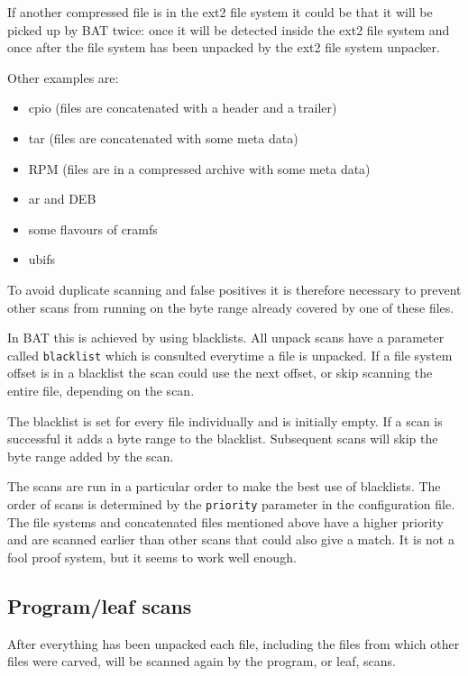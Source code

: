 \documentclass[10pt]{article}
\begin{document}
If another compressed file is in the ext2 file system it could be that it will
be picked up by BAT twice: once it will be detected inside the ext2 file system
and once after the file system has been unpacked by the ext2 file system
unpacker.

Other examples are:

\begin{itemize}
\item cpio (files are concatenated with a header and a trailer)
\item tar (files are concatenated with some meta data)
\item RPM (files are in a compressed archive with some meta data)
\item ar and DEB
\item some flavours of cramfs
\item ubifs
\end{itemize}

To avoid duplicate scanning and false positives it is therefore necessary to
prevent other scans from running on the byte range already covered by one of
these files.

In BAT this is achieved by using blacklists. All unpack scans have a parameter
called \texttt{blacklist} which is consulted everytime a file is unpacked. If
a file system offset is in a blacklist the scan could use the next offset, or
skip scanning the entire file, depending on the scan.

The blacklist is set for every file individually and is initially empty. If a
scan is successful it adds a byte range to the blacklist. Subsequent scans
will skip the byte range added by the scan.

The scans are run in a particular order to make the best use of blacklists. The
order of scans is determined by the \texttt{priority} parameter in the
configuration file. The file systems and concatenated files mentioned above
have a higher priority and are scanned earlier than other scans that could also
give a match. It is not a fool proof system, but it seems to work well enough.

\subsection{Program/leaf scans}

After everything has been unpacked each file, including the files from which
other files were carved, will be scanned again by the program, or leaf, scans.
\end{document}
